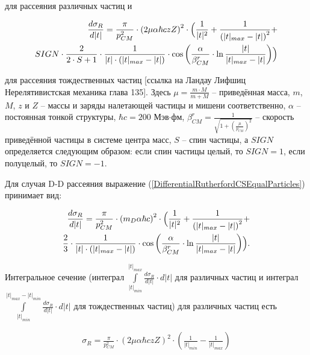 \documentclass[a4paper,12pt]{article}
\begin{document}
\begin{large}
	для рассеяния различных частиц и
	
\begin{equation}
\label{DifferentialRutherfordCSEqualParticles}
\begin{aligned} 
  \frac{d \sigma_R}{d|t|} = \frac{\pi}{p^2_{CM}} \cdot \left( 2 \mu \alpha \hbar c z Z \right)^2 \cdot               \Bigl( \frac{1}{|t|^2} + \frac{1}{\left( |t|_{max} - |t| \right)^2} + \\
  SIGN \cdot \frac{2}{2 \cdot S+1} \cdot
  \frac{1}{|t| \cdot \left( |t|_{max} -|t| \right)}
  \cdot \cos{ \left( \frac{\alpha}{\beta^r_{CM}}
  \cdot \ln{ \frac{|t|}{|t|_{max} -|t|} } \right)}
\Bigr)
\end{aligned}
\end{equation}

	для рассеяния тождественных частиц [ссылка на Ландау Лифшиц Нерелятивистская механика глава 135].
	Здесь $\mu=\frac{m\cdot M}{m+M}$ -- приведённая масса, $m$, $M$, $z$ и $Z$ -- массы и заряды налетающей частицы и мишени соответственно, $\alpha$ -- постоянная тонкой структуры, $\hbar c=200$ Мэв$\cdot$фм, $\beta^r_{CM}=\frac{1}{\sqrt{1+\left( \frac{\mu}{p_{CM}} \right)^2 }}$ -- скорость приведённой частицы в системе центра масс, $S$ -- спин частицы, а $SIGN$ определяется следующим образом: если спин частицы целый, то $SIGN=1$, если полуцелый, то $SIGN=-1$.
	
	Для случая D-D рассеяния выражение (\ref{DifferentialRutherfordCSEqualParticles}) принимает вид:
	
\begin{equation}
\label{DifferentialRutherfordCSEqualDD}
\begin{aligned} 
  \frac{d \sigma_R}{d|t|} = \frac{\pi}{p^2_{CM}} \cdot \left( m_D \alpha \hbar c \right)^2 \cdot               \Bigl( \frac{1}{|t|^2} + \frac{1}{\left( |t|_{max} - |t| \right)^2} + \\
  \frac{2}{3} \cdot
  \frac{1}{|t| \cdot \left( |t|_{max} -|t| \right)}
  \cdot \cos{ \left( \frac{\alpha}{\beta^r_{CM}}
  \cdot \ln{ \frac{|t|}{|t|_{max} -|t|} } \right)}
\Bigr).
\end{aligned}
\end{equation}

	Интегральное сечение (интеграл $\int \limits_{|t|_{min}}^{|t|_{max}} \frac{d\sigma_R}{d|t|} \cdot d|t|$ для различных частиц и интеграл $\int \limits_{|t|_{min}}^{|t|_{max}-|t|_{min}} \frac{d\sigma_R}{d|t|} \cdot d|t|$ для тождественных частиц) для различных частиц есть

\begin{equation}
\label{IntegralRutherfordCSDifferentParticles}
\begin{aligned} 
  \sigma_R = \frac{\pi}{p^2_{CM}} \cdot \left( 2 \mu \alpha \hbar c z Z \right)^2 \cdot \left( \frac{1}{|t|_{min}} - \frac{1}{|t|_{max}} \right) 
\end{aligned}
\end{equation}


\end{large}
\end{document}
